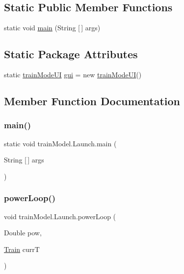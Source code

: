 \subsection*{Static Public Member Functions}
\begin{DoxyCompactItemize}
\item 
static void \hyperlink{classtrainModel_1_1Launch_a94e43f9ec39a2fd0fec5144eff076f34}{main} (String \mbox{[}$\,$\mbox{]} args)
\end{DoxyCompactItemize}
\subsection*{Static Package Attributes}
\begin{DoxyCompactItemize}
\item 
static \hyperlink{classtrainModel_1_1trainModeUI}{train\+Mode\+UI} \hyperlink{classtrainModel_1_1Launch_a54ad9d8c3da59d4e2aaca7bb7e73df6f}{gui} = new \hyperlink{classtrainModel_1_1trainModeUI}{train\+Mode\+UI}()
\end{DoxyCompactItemize}


\subsection{Member Function Documentation}
\mbox{\label{classtrainModel_1_1Launch_a94e43f9ec39a2fd0fec5144eff076f34}} 
\subsubsection{\texorpdfstring{main()}{main()}}
{\footnotesize\ttfamily static void train\+Model.\+Launch.\+main (\begin{DoxyParamCaption}\item[{String \mbox{[}$\,$\mbox{]}}]{args }\end{DoxyParamCaption})\hspace{0.3cm}{\ttfamily [static]}}

\mbox{\label{classtrainModel_1_1Launch_aeb9937905b93f52cdfef74d098988e8d}} 
\subsubsection{\texorpdfstring{power\+Loop()}{powerLoop()}}
{\footnotesize\ttfamily void train\+Model.\+Launch.\+power\+Loop (\begin{DoxyParamCaption}\item[{Double}]{pow,  }\item[{\hyperlink{classtrainModel_1_1Train}{Train}}]{currT }\end{DoxyParamCaption})}



